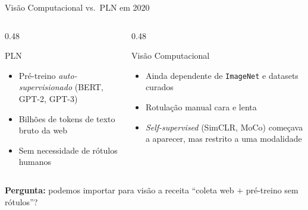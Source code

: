\documentclass[aspectratio=169,xcolor=dvipsnames]{beamer}
\begin{document}
  \begin{frame}{Visão Computacional vs.\ PLN em 2020}
    \begin{columns}[T]
      \begin{column}{0.48\textwidth}
        \begin{block}{PLN}
          \begin{itemize}
            \item Pré-treino \textit{auto-supervisionado} (BERT, GPT-2, GPT-3)
            \item Bilhões de tokens de texto bruto da web
            \item Sem necessidade de rótulos humanos
          \end{itemize}
        \end{block}
      \end{column}
      \begin{column}{0.48\textwidth}
        \begin{alertblock}{Visão Computacional}
          \begin{itemize}
            \item Ainda dependente de \texttt{ImageNet} e datasets curados
            \item Rotulação manual cara e lenta
            \item \textit{Self-supervised} (SimCLR, MoCo) começava a aparecer, mas restrito a uma modalidade
          \end{itemize}
        \end{alertblock}
      \end{column}
    \end{columns}

    \vspace{0.6em}
    \centering
    \textbf{Pergunta:} podemos importar para visão a receita ``coleta web $+$ pré-treino sem rótulos''?
  \end{frame}
\end{document}

